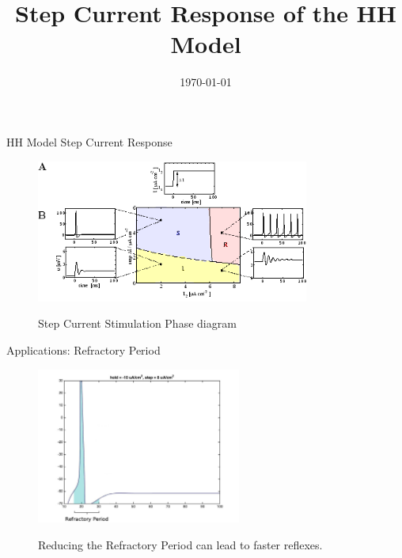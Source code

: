 \documentclass{beamer}
\title[A Constant Current Applied to the HH Model Produces a Train of Action Potentials.]{Step Current Response of the HH Model}
\author[E.Ioannidis \& J.Hobin] {\
   \texorpdfstring{\
        \begin{columns}
            \column{.45\linewidth}
            \centering
            Eleftherios Ioannidis\\
            \href{mailto:elefthei@mit.edu}{elefthei@mit.edu}
            \column{.45\linewidth}
            \centering
            James Hobin\\
            \href{mailto:hobinjk@mit.edu}{hobinjk@mit.edu}
        \end{columns}
   }
   {Eleftherios Ioannidis \& James Hobin}
}
\institute{MIT EECS}
\date{\today}
\begin{document}
\begin{frame}
  \titlepage{}
\end{frame}

\begin{frame}{HH Model Step Current Response}
  \begin{figure}
    \centering
    \includegraphics[width = 0.8\textwidth]{./pictures/gerstner.png}

    Step Current Stimulation Phase diagram
  \end{figure}
\end{frame}

\begin{frame}{Applications: Refractory Period}
  \begin{figure}
    \centering
    \includegraphics[width = 0.6\textwidth]{./pictures/refractory.jpg}

    Reducing the Refractory Period can lead to faster reflexes.
  \end{figure}
\end{frame}
\end{document}
